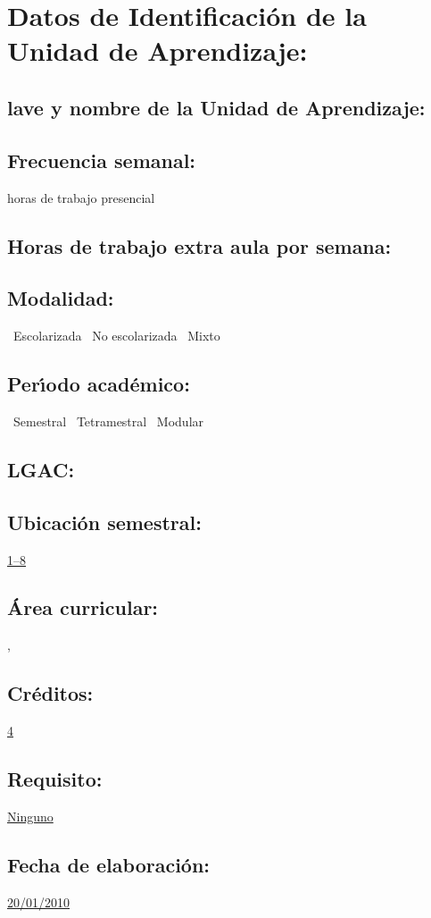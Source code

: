\documentclass[10 pt]{article}
\begin{document}


\section{Datos de Identificaci\'{o}n de la Unidad de Aprendizaje:}
\subsection{lave y nombre de la Unidad de Aprendizaje:} 
\subsection{Frecuencia semanal:} horas de trabajo presencial 
\subsection{Horas de trabajo extra aula por semana:} 
\subsection{Modalidad:} \yes~Escolarizada \no~No escolarizada \no~Mixto
\subsection{Per\'{\i}odo acad\'{e}mico:} \yes~Semestral
\no~Tetramestral \no~Modular
\subsection{LGAC:} \underline{\seys}
\subsection{Ubicaci\'{o}n semestral:} \underline{1--8}
\subsection{\'{A}rea curricular:} \underline{\fr, \le}
\subsection{Cr\'{e}ditos:} \underline{4}
\subsection{Requisito:} \underline{Ninguno}
\subsection{Fecha de elaboraci\'{o}n:} \underline{20/01/2010}
\end{document}
